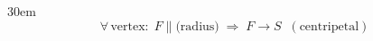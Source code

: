\documentclass[border=4pt]{standalone}
\begin{document}
\begin{varwidth}{30em}
\large
\[ \forall\, \text{vertex}: \; F \parallel \text{(radius)} \;\Rightarrow\; F \to S \;\;(\text{centripetal}) \]

\end{varwidth}
\end{document}
